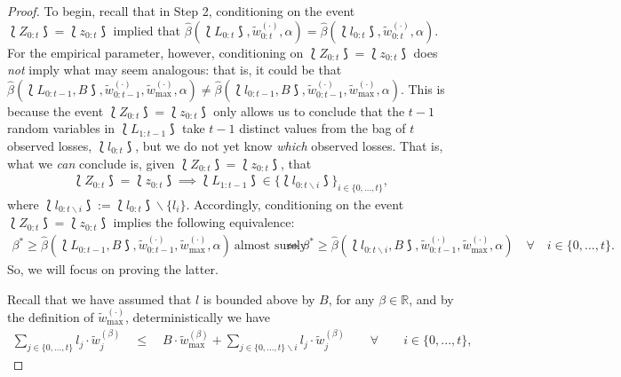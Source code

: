 \begin{proof}
To begin, recall that in Step 2, conditioning on the event $\lbag Z_{0:t} \rbag = \lbag z_{0:t} \rbag$ implied that $\hat{\beta}(\lbag L_{0:t} \rbag, \tilde{w}_{0:t}^{(\cdot)},  \alpha) = \hat{\beta}(\lbag l_{0:t} \rbag, \tilde{w}_{0:t}^{(\cdot)},  \alpha)$. For the empirical parameter, however, conditioning on $\lbag Z_{0:t} \rbag = \lbag z_{0:t} \rbag$ does \textit{not} imply what may seem analogous: that is, it could be that $\hat{\beta}(\lbag L_{0:t-1}, B \rbag, \tilde{w}_{0:t-1}^{(\cdot)}, \tilde{w}_{\max}^{(\cdot)}, \alpha) \neq \hat{\beta}(\lbag l_{0:t-1}, B \rbag, \tilde{w}_{0:t-1}^{(\cdot)}, \tilde{w}_{\max}^{(\cdot)}, \alpha)$. This is because the event $\lbag Z_{0:t} \rbag = \lbag z_{0:t} \rbag$ only allows us to conclude that the $t-1$ random variables in $\lbag L_{1:t-1}\rbag$ take $t-1$ distinct values from the bag of $t$ observed losses, $\lbag l_{0:t}\rbag$, but we do not yet know \textit{which} observed losses. That is, what we \textit{can} conclude is, given $\lbag Z_{0:t} \rbag = \lbag z_{0:t} \rbag$, that
\begin{align*}
    \lbag Z_{0:t} \rbag = \lbag z_{0:t} \rbag \implies \lbag L_{1:t-1} \rbag \in \Big\{\lbag l_{0:t\backslash i} \rbag \Big\}_{i\in \{0, ..., t\}},
\end{align*}
where $\lbag l_{0:t\backslash i} \rbag := \lbag l_{0:t} \rbag \backslash \{l_i\}$. Accordingly, conditioning on the event $\lbag Z_{0:t} \rbag = \lbag z_{0:t} \rbag$ implies the following equivalence:
\begin{align}\label{eq:cpc_oracle_empirical_inequality_equivalences}
    \beta^* \geq \hat{\beta}(\lbag L_{0:t-1}, B \rbag, \tilde{w}_{0:t-1}^{(\cdot)}, \tilde{w}_{\max}^{(\cdot)}, \alpha) \ \text{almost surely} \ & \iff \beta^* \geq \hat{\beta}(\lbag l_{0:t\backslash i}, B \rbag, \tilde{w}_{0:t-1}^{(\cdot)}, \tilde{w}_{\max}^{(\cdot)}, \alpha) \quad \forall \quad i \in \{0, ..., t\}.
\end{align}
So, we will focus on proving the latter. 




Recall that we have assumed that $l$ is bounded above by $B$, for any $\beta\in \mathbb{R}$, and by the definition of $\tilde{w}_{\max}^{(\cdot)}$, deterministically we have
\begin{align}\label{eq:cpc_step_3_conservative_adjustment}
    \sum_{j\in\{0, ..., t\}}l_j\cdot\tilde{w}_{j}^{(\beta)}
    \quad \leq \quad  B\cdot \tilde{w}_{\max}^{(\beta)} + \sum_{j\in\{0, ..., t\}\backslash i}l_j\cdot\tilde{w}_{j}^{(\beta)}  \qquad \forall \qquad i \in \{0, ..., t\},
\end{align}



\end{proof}
